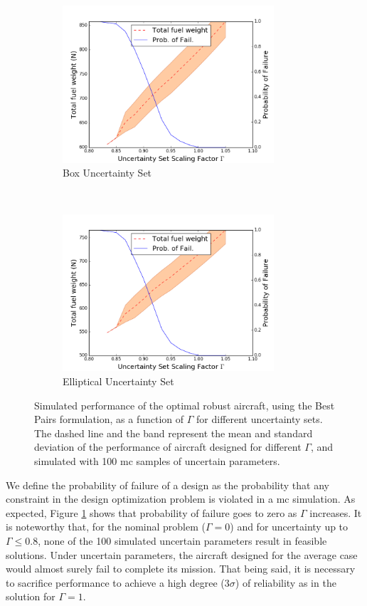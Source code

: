 \begin{figure}[ht]
    \centering
    \captionsetup{justification=centering, font=small}
    \begin{subfigure}{0.49\textwidth}
        \centering
        \includegraphics[height=2.3in]{signomial_simple_flight/box_best_pairs.png}
         \caption{Box Uncertainty Set}
    \end{subfigure}%
    ~ 
    \begin{subfigure}{0.49\textwidth}
        \centering
        \includegraphics[height=2.3in]{signomial_simple_flight/ell_best_pairs.png}
         \caption{Elliptical Uncertainty Set}
    \end{subfigure}
    \caption{Simulated performance of the optimal robust aircraft, using the Best Pairs formulation,
    as a function of $\Gamma$ for different uncertainty sets.
    The dashed line and the band represent the mean and standard deviation of the performance
    of aircraft designed for different $\Gamma$,
    and simulated with 100 \gls{mc} samples of uncertain parameters.}
    \label{fig:probOfFailure}
\end{figure}

We define the probability of failure of a design as the probability that any constraint
in the design optimization problem is violated in a \gls{mc} simulation.
As expected, Figure \ref{fig:probOfFailure} shows that probability of failure goes to zero as $\Gamma$ increases.
It is noteworthy that, for the nominal problem ($\Gamma = 0$) and for uncertainty up to $\Gamma \leq 0.8$, none of
the 100 simulated uncertain parameters result in feasible solutions. Under uncertain parameters,
the aircraft designed for the average case would almost surely fail to complete its mission.
That being said, it is necessary to sacrifice performance to achieve a high degree ($3\sigma$) of
reliability as in the solution for $\Gamma = 1$.

